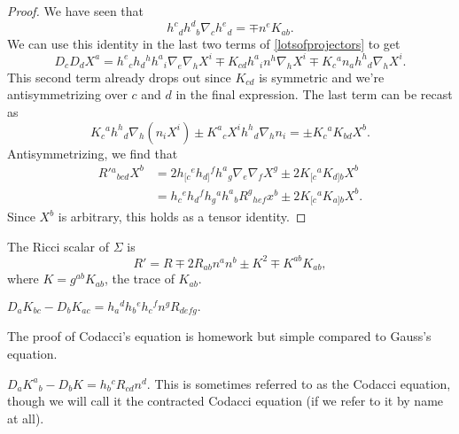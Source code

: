 \begin{proof}
    We have seen that
    \begin{equation}\label{projectorsandcurvature}
        h^c{}_d h^d{}_b \nabla_c h^e{}_d = \mp n^e K_{ab}.
    \end{equation}
    We can use this identity in the last two terms of \ref{lotsofprojectors} to get
    \begin{equation}
        D_c D_d X^a = h^e{}_c h_d{}^h h^a{}_i \nabla_e \nabla_h X^i \mp K_{cd} h^a{}_i n^h \nabla_h X^i \mp K_c{}^a n_a h^h{}_d \nabla_h X^i.
    \end{equation}
    This second term already drops out since $K_{cd}$ is symmetric and we're antisymmetrizing over $c$ and $d$ in the final expression. The last term can be recast as
    \begin{equation}
        K_c{}^a h^h{}_d \nabla_h(n_i X^i)\pm K^a{}_c X^i h^h{}_d \nabla_h n_i = \pm K_c{}^a K_{bd}X^b.
    \end{equation}
    Antisymmetrizing, we find that
    \begin{align*}
        R'{}^a{}_{bcd} X^b &= 2h_{[c}{}^e h_{d]}{}^f h^a{}_g \nabla_e \nabla_f X^g \pm 2 K_{[c}{}^a K_{d]b} X^b\\
        &= h_c{}^e h_d{}^f h_g{}^a h^a{}_b R^g{}_{hef} x^b \pm 2 K_{[c}{}^a K_{a]b}X^b.
    \end{align*}
    Since $X^b$ is arbitrary, this holds as a tensor identity.
\end{proof}
\begin{lem}
    The Ricci scalar of $\Sigma$ is 
    \begin{equation}
        R'=R\mp 2 R_{ab} n^a n^b \pm K^2 \mp K^{ab}K_{ab},
    \end{equation}
    where $K=g^{ab}K_{ab}$, the trace of $K_{ab}$.
\end{lem}
\begin{prop}
    $D_aK_{bc}-D_b K_{ac}=h_a{}^d h_b{}^e h_c{}^f n^g R_{defg}.$
\end{prop}
The proof of Codacci's equation is homework but simple compared to Gauss's equation.
\begin{lem}
    $D_a K^a{}_b-D_b K = h_b{}^c R_{cd} n^d$.
    This is sometimes referred to as the Codacci equation, though we will call it the contracted Codacci equation (if we refer to it by name at all).
\end{lem}

